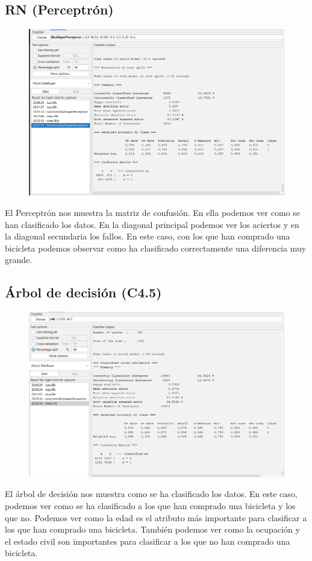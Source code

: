 \documentclass[12pt]{article}
\begin{document}
\subsection{RN (Perceptrón)}

\begin{figure}[h!]
    \centering
    \includegraphics[width=.6\textwidth]{Multilayer.PNG}
    \label{fig:my_label}
\end{figure}

El Perceptrón nos muestra la matriz de confusión. En ella podemos ver como se han clasificado los datos. En la diagonal principal
podemos ver los aciertos y en la diagonal secundaria los fallos. En este caso, con los que han comprado una bicicleta podemos observar
como ha clasificado correctamente una diferencia muy grande.

\clearpage

\subsection{Árbol de decisión (C4.5)}

\begin{figure}[h!]
    \centering
    \includegraphics[width=.6\textwidth]{treeJ48.PNG}
    \label{fig:my_label}
\end{figure}

El árbol de decisión nos muestra como se ha clasificado los datos. En este caso, podemos ver como se ha clasificado a los que han comprado
una bicicleta y los que no. Podemos ver como la edad es el atributo más importante para clasificar a los que han comprado una bicicleta.
También podemos ver como la ocupación y el estado civil son importantes para clasificar a los que no han comprado una bicicleta.
\end{document}
